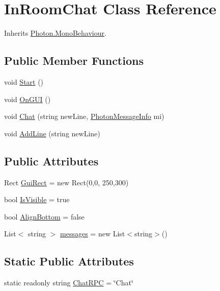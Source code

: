 \hypertarget{class_in_room_chat}{}\section{In\+Room\+Chat Class Reference}
\label{class_in_room_chat}


Inherits \hyperlink{class_photon_1_1_mono_behaviour}{Photon.\+Mono\+Behaviour}.

\subsection*{Public Member Functions}
\begin{DoxyCompactItemize}
\item 
void \hyperlink{class_in_room_chat_a6b783c7f6c334ee0b0c1384f83928fab}{Start} ()
\item 
void \hyperlink{class_in_room_chat_af9fe56fdb21db3868eda31175fe5512c}{On\+G\+UI} ()
\item 
void \hyperlink{class_in_room_chat_a4d96349205f511958033febb9f30461f}{Chat} (string new\+Line, \hyperlink{class_photon_message_info}{Photon\+Message\+Info} mi)
\item 
void \hyperlink{class_in_room_chat_ad942cd6f67bcf966adcf976fbd3055bd}{Add\+Line} (string new\+Line)
\end{DoxyCompactItemize}
\subsection*{Public Attributes}
\begin{DoxyCompactItemize}
\item 
Rect \hyperlink{class_in_room_chat_acc85d6ed055432d0cff5a93f8de88a39}{Gui\+Rect} = new Rect(0,0, 250,300)
\item 
bool \hyperlink{class_in_room_chat_adbfef915a36e98692020697a6cacfca6}{Is\+Visible} = true
\item 
bool \hyperlink{class_in_room_chat_a83f0c6044fed77a2950457f30ac2607c}{Align\+Bottom} = false
\item 
List$<$ string $>$ \hyperlink{class_in_room_chat_aaf95335cf66ac85905d13191dd5da780}{messages} = new List$<$string$>$()
\end{DoxyCompactItemize}
\subsection*{Static Public Attributes}
\begin{DoxyCompactItemize}
\item 
static readonly string \hyperlink{class_in_room_chat_aa0b4576ed000e07dc1dc587afcf0f21c}{Chat\+R\+PC} = \char`\"{}Chat\char`\"{}
\end{DoxyCompactItemize}
